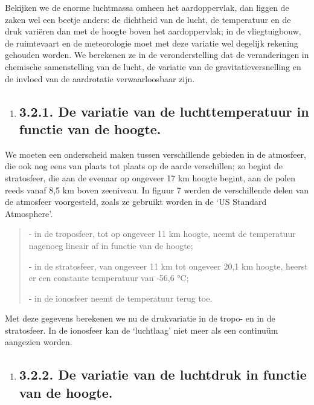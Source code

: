\documentclass[]{article}
\begin{document}
Bekijken we de enorme luchtmassa omheen het aardoppervlak, dan liggen de
zaken wel een beetje anders: de dichtheid van de lucht, de temperatuur
en de druk variëren dan met de hoogte boven het aardoppervlak; in de
vliegtuigbouw, de ruimtevaart en de meteorologie moet met deze variatie
wel degelijk rekening gehouden worden. We berekenen ze in de
veronderstelling dat de veranderingen in chemische samenstelling van de
lucht, de variatie van de gravitatieversnelling en de invloed van de
aardrotatie verwaarloosbaar zijn.

\begin{enumerate}
\item
  \subsection{3.2.1. De variatie van de luchttemperatuur in functie van
  de
  hoogte.}\label{de-variatie-van-de-luchttemperatuur-in-functie-van-de-hoogte.}
\end{enumerate}

We moeten een onderscheid maken tussen verschillende gebieden in de
atmosfeer, die ook nog eens van plaats tot plaats op de aarde
verschillen; zo begint de stratosfeer, die aan de evenaar op ongeveer 17
km hoogte begint, aan de polen reeds vanaf 8,5 km boven zeeniveau. In
figuur 7 werden de verschillende delen van de atmosfeer voorgesteld,
zoals ze gebruikt worden in de `US Standard Atmosphere'.

\begin{quote}
- in de troposfeer, tot op ongeveer 11 km hoogte, neemt de temperatuur
nagenoeg lineair af in functie van de hoogte;

- in de stratosfeer, van ongeveer 11 km tot ongeveer 20,1 km hoogte,
heerst er een constante temperatuur van -56,6 °C;

- in de ionosfeer neemt de temperatuur terug toe.
\end{quote}

Met deze gegevens berekenen we nu de drukvariatie in de tropo- en in de
stratosfeer. In de ionosfeer kan de `luchtlaag' niet meer als een
continuüm aangezien worden.

\begin{enumerate}
\item
  \subsection{3.2.2. De variatie van de luchtdruk in functie van de
  hoogte.}\label{de-variatie-van-de-luchtdruk-in-functie-van-de-hoogte.}
\end{enumerate}
\end{document}
